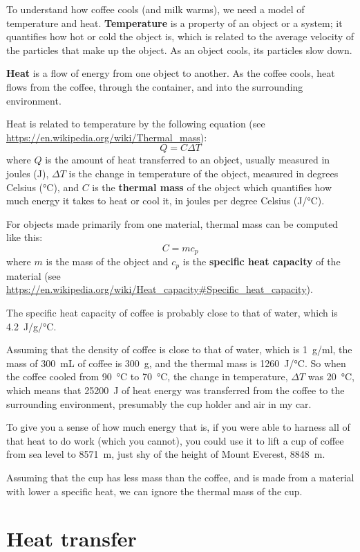 \documentclass[12pt]{book}
\theoremstyle{exercise}
\begin{document}
To understand how coffee cools (and milk warms), we need a model of temperature and heat.  {\bf Temperature} is a property of an object or a system; it quantifies how hot or cold the object is, which is related to the average velocity of the particles that make up the object.  As an object cools, its particles slow down.

{\bf Heat} is a flow of energy from one object to another.  As the coffee cools, heat flows from the coffee, through the container, and into the surrounding environment.

Heat is related to temperature by the following equation (see \url{https://en.wikipedia.org/wiki/Thermal_mass}):
%
\[ Q = C \Delta T \]
%
where $Q$ is the amount of heat transferred to an object, usually measured in joules (\si{J}), $\Delta T$ is the change in temperature of the object, measured in degrees Celsius (\si{\celsius}), and $C$ is the {\bf thermal mass} of the object which quantifies how much energy it takes to heat or cool it, in joules per degree Celsius (\si{J/\celsius}).

For objects made primarily from one material, thermal mass can be computed like this:
%
\[ C = m c_p \]
%
where $m$ is the mass of the object and $c_p$ is the {\bf specific heat capacity} of the material (see \url{https://en.wikipedia.org/wiki/Heat_capacity#Specific_heat_capacity}).

The specific heat capacity of coffee is probably close to that of water, which is \SI{4.2}{J/g/\celsius}.

Assuming that the density of coffee is close to that of water, which is \SI{1}{g/ml}, the mass of \SI{300}{mL} of coffee is \SI{300}{g}, and the thermal mass is \SI{1260}{J/\celsius}.  So when the coffee cooled from \SI{90}{\celsius} to \SI{70}{\celsius}, the change in temperature, $\Delta T$ was \SI{20}{\celsius}, which means that \SI{25200}{J} of heat energy was transferred from the coffee to the surrounding environment, presumably the cup holder and air in my car.

To give you a sense of how much energy that is, if you were able to harness all of that heat to do work (which you cannot), you could use it to lift a cup of coffee from sea level to \SI{8571}{m}, just shy of the height of Mount Everest, \SI{8848}{m}.

Assuming that the cup has less mass than the coffee, and is made from a material with lower a specific heat, we can ignore the thermal mass of the cup.


\section{Heat transfer}
\end{document}
